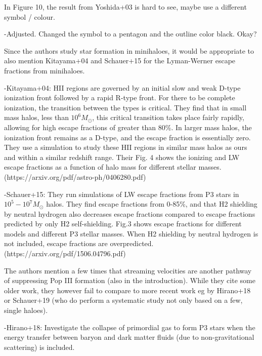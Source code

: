\documentclass[11pt]{article}
\newenvironment{referee}[1][]{%
    \ignorespaces%
    \begin{mdframed}[style=myquotestyle,#1]%
}{%
    \end{mdframed}%
    \ignorespacesafterend%
}%
\begin{document}
\begin{referee}
In Figure 10, the result from Yoshida+03 is hard to see, maybe use a different symbol / colour.
\end{referee}
-Adjusted. Changed the symbol to a pentagon and the outline color black. Okay?

\begin{referee}
Since the authors study star formation in minihaloes, it would be appropriate to also mention Kitayama+04 and Schauer+15 for the Lyman-Werner escape fractions from minihaloes.
\end{referee}
-Kitayama+04: HII regions are governed by an initial slow and weak D-type ionization front followed by a rapid R-type front. For there to be complete ionization, the transition between the types is critical. They find that in small mass halos, less than $10^6 M_{\odot}$, this critical transition takes place fairly rapidly, allowing for high escape fractions of greater than 80\%. In larger mass halos, the ionization front remains as a D-type, and the escape fraction is essentially zero. They use a simulation to study these HII regions in similar mass halos as ours and within a similar redshift range. Their Fig. 4 shows the ionizing and LW escape fractions as a function of halo mass for different stellar masses. (https://arxiv.org/pdf/astro-ph/0406280.pdf)

-Schauer+15: They run simulations of LW escape fractions from P3 stars in $10^5 - 10^7 M_{\odot}$ halos. They find escape fractions from 0-85\%, and that H2 shielding by neutral hydrogen also decreases escape fractions compared to escape fractions predicted by only H2 self-shielding. Fig.3 shows escape fractions for different models and different P3 stellar masses. When H2 shielding by neutral hydrogen is not included, escape fractions are overpredicted. (https://arxiv.org/pdf/1506.04796.pdf)

\begin{referee}
The authors mention a few times that streaming velocities are another pathway of suppressing Pop III formation (also in the introduction). While they cite some older work, they however fail to compare to more recent work eg by Hirano+18 or Schauer+19 (who do perform a systematic study not only based on a few, single haloes).
\end{referee}
-Hirano+18: Investigate the collapse of primordial gas to form P3 stars when the energy transfer between baryon and dark matter fluids (due to non-gravitational scattering) is included.
\end{document}
